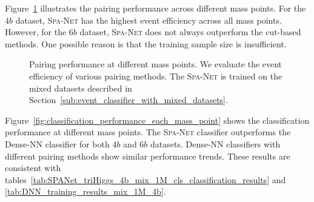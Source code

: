 \documentclass[12pt]{article}
\begin{document}
        Figure~\ref{fig:pairing_performance_each_mass_point} illustrates the pairing performance across different mass points. For the $4b$ dataset, \textsc{Spa-Net} has the highest event efficiency across all mass points. However, for the $6b$ dataset, \textsc{Spa-Net} does not always outperform the cut-based methods. One possible reason is that the training sample size is insufficient.
        \begin{figure}[htpb]
            \centering
            \caption{Pairing performance at different mass points. We evaluate the event efficiency of various pairing methods. The \textsc{Spa-Net} is trained on the mixed datasets described in Section~\ref{sub:event_classifier_with_mixed_datasets}.}  
            \label{fig:pairing_performance_each_mass_point}  
        \end{figure}

        Figure~\ref{fig:classification_performance_each_mass_point} shows the classification performance at different mass points. The \textsc{Spa-Net} classifier outperforms the Dense-NN classifier for both $4b$ and $6b$ datasets. Dense-NN classifiers with different pairing methods show similar performance trends. These results are consistent with tables~\ref{tab:SPANet_triHiggs_4b_mix_1M_cls_classification_results} and \ref{tab:DNN_training_results_mix_1M_4b}.  
\end{document}
